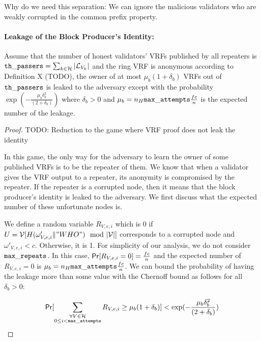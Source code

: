 
Why do we need this separation: We can ignore the malicious validators who are weakly corrupted in the common prefix property.

\paragraph{Leakage of the Block Producer's Identity:}


\begin{lemma}
Assume that the number of honest validators' VRFs published by all repeaters is $ \mathtt{th\_passers} =  \sum_{k \in \mathcal{H}} |\mathcal{L}_{V_k}| $ and the ring VRF is anonymous according to Definition X (TODO), the owner of at most $ \mu_{b} (1+\delta_b) $ VRFs out of $ \mathtt{th\_passers} $ is leaked to the adversary except with the probability  $  \exp(-\frac{\mu_b\delta_b^2}{(2+\delta_b)}) $ where $ \delta_b > 0$ and $ \mu_b = n_H \mathtt{max\_attempts} \frac{fc}{n} $ is the expected number of the leakage.
\end{lemma}

\begin{proof}
	
	TODO: Reduction to the game where VRF proof does not leak the identity
	
	In this game, the only way for the adversary to learn the owner of some published VRFs is to be the repeater of them. We know that when a validator gives the VRF output to a repeater, its anonymity is compromised by the repeater. If the repeater is a corrupted node, then it means that the block producer's identity is leaked to the adversary. We first discuss what the expected number of these unfortunate nodes is. 
	
	
	We define a random variable $ R_{V,e,i} $ which is 0 if $ U = \mathcal{V}[H(\omega'_{V,e,i} \| "WHO") \mod |\mathcal{V}|]  $ corresponds to a corrupted node and $ \omega'_{V,e,i} < c $. Otherwise, it is 1. For simplicity of our analysis, we do not consider $ \mathtt{max\_repeats} $. In this case, $ \mathsf{Pr}[R_{V,e,i} = 0] = \frac{fc}{n} $ and
	the expected number of $ R_{V,e,i}  = 0$ is  $ \mu_b = n_H \mathtt{max\_attempts} \frac{fc}{n} $. We can bound the probability of having the leakage more than some value with the Chernoff bound as follows for all $ \delta_b > 0 	 $:
	
	\begin{equation}\label{eq:beforeepcoh}
	\mathsf{Pr}[ \sum_{\substack{ \forall V \in \mathcal{H} \\0\leq i < \mathtt{max\_attempts}}} R_{V,e,i} \geq \mu_b (1+ \delta_b)] < \exp(-\frac{\mu_b\delta_b^2}{(2+\delta_b)}) \nonumber
	\end{equation}
	
	
\end{proof}


